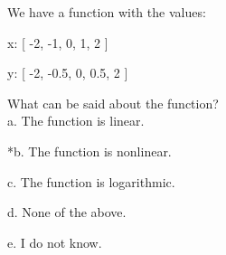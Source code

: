 
We have a function with the values: 

	x: [ -2, -1, 0, 1, 2 ]

	y: [ -2, -0.5,  0, 0.5, 2 ]

What can be said about the function? \\

a. The function is linear.

*b. The function is nonlinear.

c.  The function is logarithmic.

d. None of the above. 

e. I do not know. \\
